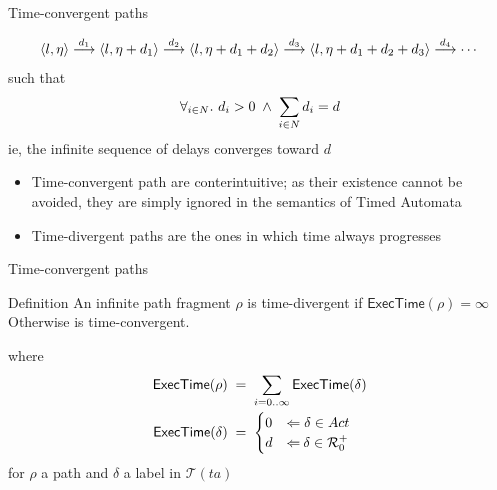 \documentclass{beamer}
\def\dgold#1{{\darkgoldenrod #1}}
\def\dkb#1{{\blue #1}}
\def\st{\mathbf{.}\,}
\def\R{\mathcal{R}}
\def\TL#1{\mathcal{T}(#1)}
\def\ET#1{\mathsf{ExecTime(#1)}}
\begin{document}
\begin{slide}{Time-convergent paths}
\small

\begin{equation*}
\mathopen{\langle}l,\eta\mathclose{\rangle}  \stackrel{d_1}{\longrightarrow} \mathopen{\langle}l,\eta + d_1\mathclose{\rangle}  \stackrel{d_2}{\longrightarrow} \mathopen{\langle}l,\eta + d_1 + d_2\mathclose{\rangle}  \stackrel{d_3}{\longrightarrow} \mathopen{\langle}l,\eta + d_1 + d_2 + d_3\mathclose{\rangle}  \stackrel{d_4}{\longrightarrow} 
\cdots  
\end{equation*}
such that 
\begin{equation*}
\forall_{i \in N}\st\, d_i > 0\; \e\; \sum_{i \in N}  d_i = d
\end{equation*}
ie, the \dgold{infinite sequence of delays converges toward $d$}

\begin{itemize}
\item Time-convergent path are \dgold{conterintuitive}; as their existence cannot be avoided, they are simply  \dkb{ignored} in the semantics of Timed Automata
\item Time-\dkb{divergent} paths are the ones in which time always progresses
\end{itemize}
\end{slide}

\begin{slide}{Time-convergent paths}
\small

\begin{block}{Definition}
An infinite path fragment $\rho$ is \dkb{time-divergent} if $\ET{\rho} = \infty$\\
Otherwise is  \dkb{time-convergent}. 
\end{block}

where
\begin{align*}
\ET{\rho}\; & =\; \sum_{i=0 .. \infty} \ET{\delta}\\
\ET{\delta}\; & =\; \begin{cases}
0 & \rimp\;  \delta \in Act\\
d & \rimp\:  \delta \in \R_0^+
\end{cases}
\end{align*}
for $\rho$ a path and $\delta$ a label in $\TL{ta}$ 
\end{slide}
\end{document}
